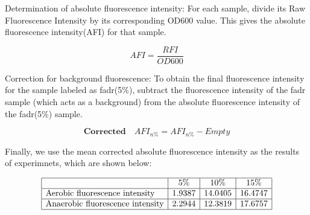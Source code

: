 \documentclass[UTF8]{article}
\begin{document}
Determination of absolute fluorescence intensity:
For each sample, divide its Raw Fluorescence Intensity by its corresponding OD600 value. This gives the absolute fluorescence intensity(AFI) for that sample.

$$
AFI = \frac{RFI}{OD 600}
$$

Correction for background fluorescence:
To obtain the final fluorescence intensity for the sample labeled as fadr(5\%), subtract the fluorescence intensity of the fadr sample (which acts as a background) from the absolute fluorescence intensity of the fadr(5\%) sample.

$$
	\textbf{Corrected} \quad AFI_{n\%}  = AFI_{n\%} - Empty
$$

Finally, we use the mean corrected absolute fluorescence intensity as the results of experimnets, which are shown below:

$$
\begin{array}{|l|c|c|c|}
	\hline & 5 \% & 10 \% & 15 \% \\
	\hline \text{Aerobic fluorescence intensity}  & 1.9387 & 14.0405 & 16.4747 \\
	\hline \text{Anaerobic fluorescence intensity} & 2.2944 & 12.3819 & 17.6757 \\
	\hline
\end{array}
$$
\end{document}
